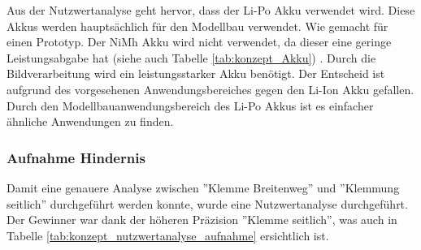 \documentclass[../main.tex]{subfiles}
\begin{document}
Aus der Nutzwertanalyse geht hervor, dass der Li-Po Akku verwendet wird. Diese Akkus werden hauptsächlich für den Modellbau verwendet. Wie gemacht für einen Prototyp. Der NiMh Akku wird nicht verwendet, da dieser eine geringe Leistungsabgabe hat (siehe auch Tabelle \ref{tab:konzept_Akku}) \cite{nimh_vs_lipo_rcrush}.
Durch die Bildverarbeitung wird ein leistungsstarker Akku benötigt. Der Entscheid ist aufgrund des vorgesehenen Anwendungsbereiches gegen den Li-Ion Akku gefallen. Durch den Modellbauanwendungsbereich des Li-Po Akkus ist es einfacher ähnliche Anwendungen zu finden.

\newpage
\subsubsection{Aufnahme Hindernis}
\label{a3:Aufnahme_Hindernis}
        Damit eine genauere Analyse zwischen ''Klemme Breitenweg'' und ''Klemmung seitlich'' durchgeführt werden konnte, wurde eine Nutzwertanalyse durchgeführt. Der Gewinner war dank der höheren Präzision ''Klemme seitlich'', was auch in Tabelle \ref{tab:konzept_nutzwertanalyse_aufnahme} ersichtlich ist.
        
        \begin{table}[H]
            \caption{Nutzwertanalyse Hindernis Aufnahme}
            \label{tab:konzept_nutzwertanalyse_aufnahme}
        \end{table}
\end{document}
